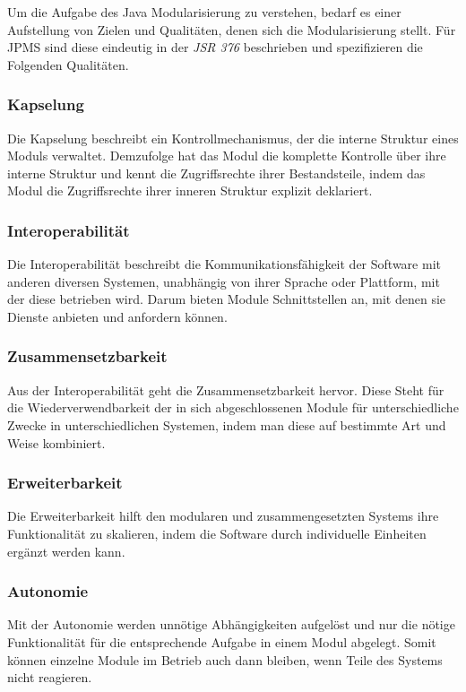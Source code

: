     Um die Aufgabe des Java Modularisierung zu verstehen, bedarf es einer Aufstellung von Zielen und Qualitäten, denen sich die Modularisierung stellt. Für JPMS sind diese eindeutig in der \textit{JSR 376} \cite{jmsOracle,java9modRevealed} beschrieben und spezifizieren die Folgenden Qualitäten.

    \subsubsection{Kapselung}
      Die Kapselung beschreibt ein Kontrollmechanismus, der die interne Struktur eines Moduls verwaltet. Demzufolge hat das Modul die komplette Kontrolle über ihre interne Struktur und kennt die Zugriffsrechte ihrer Bestandsteile, indem das Modul die Zugriffsrechte ihrer inneren Struktur explizit deklariert.

    \subsubsection{Interoperabilität}
      Die Interoperabilität beschreibt die Kommunikationsfähigkeit der Software mit anderen diversen Systemen, unabhängig von ihrer Sprache oder Plattform, mit der diese betrieben wird. Darum bieten Module Schnittstellen an, mit denen sie Dienste anbieten und anfordern können.

    \subsubsection{Zusammensetzbarkeit}
      Aus der Interoperabilität geht die Zusammensetzbarkeit hervor. Diese Steht für die Wiederverwendbarkeit der in sich abgeschlossenen Module für unterschiedliche Zwecke in unterschiedlichen Systemen, indem man diese auf bestimmte Art und Weise kombiniert. 

    \subsubsection{Erweiterbarkeit}
     Die Erweiterbarkeit hilft den modularen und zusammengesetzten Systems ihre Funktionalität zu skalieren, indem die Software durch individuelle Einheiten ergänzt werden kann. 

    \subsubsection{Autonomie}
      Mit der Autonomie werden unnötige Abhängigkeiten aufgelöst und nur die nötige Funktionalität für die entsprechende Aufgabe in einem Modul abgelegt. Somit können einzelne Module im Betrieb auch dann bleiben, wenn Teile des Systems nicht reagieren.

